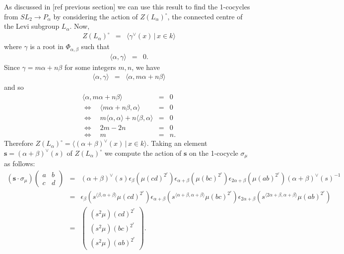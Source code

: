 As discussed in [ref previous section] we can use this result to find the 1-cocycles from $SL_2 \rightarrow P_\alpha$ by considering the action of $Z(L_\alpha)^\circ$, the connected centre of the Levi subgroup $L_\alpha$. Now, 
\begin{eqnarray*}
Z(L_\alpha)^\circ &=& \langle \gamma^\vee(x)\,|\,x \in k \rangle
\end{eqnarray*}
where $\gamma$ is a root in $\Phi_{\alpha, \beta}$ such that
\begin{eqnarray}
\langle \alpha, \gamma \rangle &=& 0.
\end{eqnarray}
Since $\gamma = m\alpha + n\beta$ for some integers $m,n$, we have
\begin{eqnarray}
\langle \alpha, \gamma \rangle &=& \langle \alpha, m\alpha + n\beta \rangle
\end{eqnarray}
and so
\begin{eqnarray*}
 \langle \alpha, m\alpha + n\beta \rangle &=& 0 \\
\Longleftrightarrow \quad  \langle m\alpha + n\beta, \alpha \rangle &=& 0 \\
\Longleftrightarrow \quad  m\langle \alpha, \alpha \rangle + n \langle \beta, \alpha\rangle &=& 0 \\
\Longleftrightarrow \quad  2m - 2n &=& 0 \\
\Longleftrightarrow \quad  m &=& n.
\end{eqnarray*}
Therefore $Z(L_ \alpha)^\circ = \langle (\alpha + \beta)^\vee(x)\,|\,x \in k \rangle$. Taking an element $\mathbf{s} = (\alpha + \beta)^\vee(s)$ of $Z(L_\alpha)^\circ$ we compute the action of $\mathbf{s}$ on the 1-cocycle $\sigma_\mu$ as follows:
\begin{eqnarray*}
\left(\mathbf{s}\cdot \sigma_\mu\right)
\left(\begin{matrix} a & b \\ c & d\end{matrix} \right) 
&=&
(\alpha + \beta)^\vee(s) \epsilon_\beta \left(\mu (cd)^{2^r} \right)\epsilon_{\alpha+\beta} \left(\mu(bc)^{2^r} \right)\epsilon_{2\alpha + \beta} \left(\mu(ab)^{2^r} \right)(\alpha + \beta)^\vee(s)^{-1}\\
&=&  \epsilon_\beta\left(s^{\langle\beta , \alpha+\beta\rangle}\mu (cd)^{2^r} \right)\epsilon_{\alpha+\beta} \left(s^{\langle \alpha+\beta, \alpha+\beta \rangle} \mu(bc)^{2^r} \right)\epsilon_{2\alpha + \beta} \left(s^{\langle 2\alpha+\beta, \alpha+\beta\rangle}\mu(ab)^{2^r}\right) \\
&=&
\left(\begin{matrix}
(s^2\mu)(cd)^{2^r} \\
(s^2\mu)(bc)^{2^r} \\
(s^2\mu)(ab)^{2^r}
\end{matrix}\right).
\end{eqnarray*}

